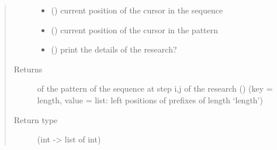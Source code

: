 \documentclass[letterpaper,10pt,english]{sphinxmanual}
\begin{document}
\begin{fulllineitems}
\begin{quote}
\begin{description}
\begin{itemize}
\item {} 
 () \textendash{} current position of the cursor in the sequence

\item {} 
 () \textendash{} current position of the cursor in the pattern

\item {} 
 () \textendash{} print the details of the research?

\end{itemize}

\item[{Returns}] \leavevmode
{} of the pattern of the sequence at step i,j of the research ({\hyperref[\detokenize{index:PrefixIndexing.prefix_indexing}]{}}) (key = length, value = list: left positions of prefixes of length ‘length’)

\item[{Return type}] \leavevmode
{} (int -\textgreater{} list of int)

\end{description}\end{quote}

\end{fulllineitems}

\end{document}

